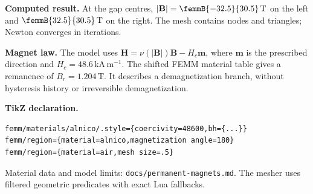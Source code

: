 \documentclass[a4paper,11pt]{article}
\begin{document}
\noindent\textbf{Computed result.}
At the gap centres, $|\mathbf B|=\femmB{-32.5}{30.5}\,\mathrm T$
on the left and $\femmB{32.5}{30.5}\,\mathrm T$ on the right.
The mesh contains  nodes and  triangles;
Newton converges in  iterations.

\medskip
\noindent\textbf{Magnet law.}
The model uses $\mathbf H=\nu(|\mathbf B|)\mathbf B-H_c\mathbf m$,
where $\mathbf m$ is the prescribed direction and $H_c=48.6\,\mathrm{kA\,m^{-1}}$.
The shifted FEMM material table gives a remanence of
$B_r=1.204\,\mathrm T$. It describes a demagnetization branch,
without hysteresis history or irreversible demagnetization.

\medskip
\noindent\textbf{TikZ declaration.}
\begin{verbatim}
femm/materials/alnico/.style={coercivity=48600,bh={...}}
femm/region={material=alnico,magnetization angle=180}
femm/region={material=air,mesh size=.5}
\end{verbatim}
\noindent\small Material data and model limits: \texttt{docs/permanent-magnets.md}.
The mesher uses filtered geometric predicates with exact Lua fallbacks.
\end{document}
